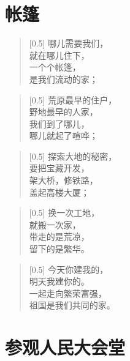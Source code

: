 \documentclass[12pt,UTF-8,openany]{ctexbook}
\begin{document}
\chapter{帐篷}

\begin{Large}
    
    \begin{verse}[0.5\linewidth]
        哪儿需要我们， \\
        就在哪儿住下， \\
        一个个帐篷， \\
        是我们流动的家；
    \end{verse}
    
    
    \begin{verse}[0.5\linewidth]
        荒原最早的住户， \\
        野地最早的人家， \\
        我们到了哪儿， \\
        哪儿就起了喧哗；
    \end{verse}
    
    
    \begin{verse}[0.5\linewidth]
        探索大地的秘密， \\
        要把宝藏开发， \\
        架大桥，修铁路， \\
        盖起高楼大厦；
    \end{verse}
    
    
    \begin{verse}[0.5\linewidth]
        换一次工地， \\
        就搬一次家， \\
        带走的是荒凉， \\
        留下的是繁华。
    \end{verse}
    
    
    \begin{verse}[0.5\linewidth]
        今天你建我的， \\
        明天我建你的。 \\
        一起走向繁荣富强， \\
        祖国是我们共同的家。
    \end{verse}
    
\end{Large}

\chapter{参观人民大会堂}
\end{document}
